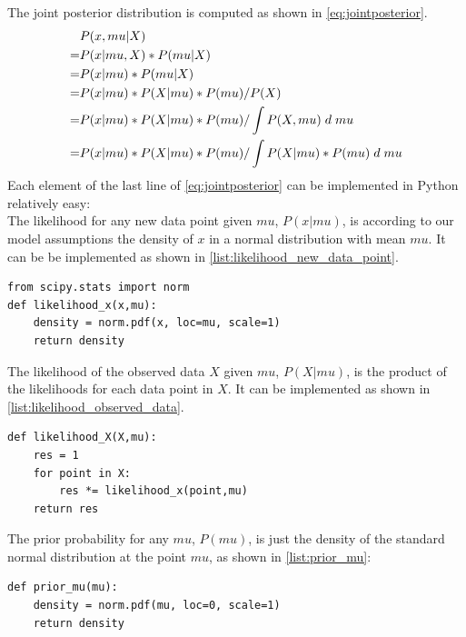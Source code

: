 \documentclass{article}
\begin{document}
The joint posterior distribution is computed as shown in \autoref{eq:jointposterior}.
\begin{equation}
\label{eq:jointposterior}
\begin{split}
&P(x,mu|X) \\
= &P(x|mu,X) * P(mu|X) \\
= &P(x|mu) * P(mu|X) \\
= &P(x|mu) * P(X|mu) * P(mu) / P(X) \\
= &P(x|mu) * P(X|mu) * P(mu) / \int P(X,mu) \hspace{1mm} d \hspace{1mm} mu \\
= &P(x|mu) * P(X|mu) * P(mu) / \int P(X|mu) * P(mu) \hspace{1mm} d \hspace{1mm} mu
\end{split}
\end{equation}
Each element of the last line of \autoref{eq:jointposterior} can be implemented in Python relatively easy: 
\\
The likelihood for any new data point given $mu$, $P(x|mu)$, is according to our model assumptions the density of $x$ in a normal distribution with mean $mu$. It can be be implemented as shown in \autoref{list:likelihood_new_data_point}.
\begin{lstlisting}[caption={Implementation of the likelihood for one data point}, label={list:likelihood_new_data_point},captionpos=b]
from scipy.stats import norm
def likelihood_x(x,mu):
    density = norm.pdf(x, loc=mu, scale=1)
    return density
\end{lstlisting}
The likelihood of the observed data $X$ given $mu$, $P(X|mu)$, is the product of the likelihoods for each data point in $X$. It can be implemented as shown in \autoref{list:likelihood_observed_data}.
\begin{lstlisting}[caption={Implementation of the likelihood for the observed data}, label={list:likelihood_observed_data},captionpos=b]
def likelihood_X(X,mu):
    res = 1
    for point in X:
        res *= likelihood_x(point,mu)
    return res
\end{lstlisting}
The prior probability for any $mu$, $P(mu)$, is just the density of the standard normal distribution at the point $mu$, as shown in \autoref{list:prior_mu}:
\begin{lstlisting}[caption={Implementation of the prior for mu}, label={list:prior_mu},captionpos=b]
def prior_mu(mu):
    density = norm.pdf(mu, loc=0, scale=1)
    return density
\end{lstlisting}
\end{document}
